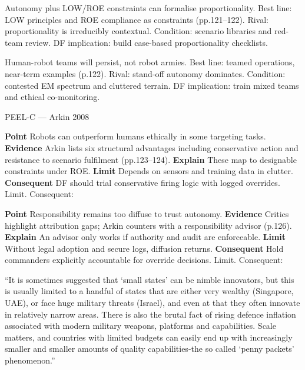 Autonomy plus LOW/ROE constraints can formalise proportionality. Best line: LOW principles and ROE compliance as constraints (pp.121–122). Rival: proportionality is irreducibly contextual. Condition: scenario libraries and red-team review. DF implication: build case-based proportionality checklists.

Human-robot teams will persist, not robot armies. Best line: teamed operations, near-term examples (p.122). Rival: stand-off autonomy dominates. Condition: contested EM spectrum and cluttered terrain. DF implication: train mixed teams and ethical co-monitoring.

PEEL-C — Arkin 2008

\textbf{Point} Robots can outperform humans ethically in some targeting tasks. \textbf{Evidence} Arkin lists six structural advantages including conservative action and resistance to scenario fulfilment (pp.123–124). \textbf{Explain} These map to designable constraints under ROE. \textbf{Limit} Depends on sensors and training data in clutter. \textbf{Consequent} DF should trial conservative firing logic with logged overrides. Limit. Consequent:

\textbf{Point} Responsibility remains too diffuse to trust autonomy. \textbf{Evidence} Critics highlight attribution gaps; Arkin counters with a responsibility advisor (p.126). \textbf{Explain} An advisor only works if authority and audit are enforceable. \textbf{Limit} Without legal adoption and secure logs, diffusion returns. \textbf{Consequent} Hold commanders explicitly accountable for override decisions. Limit. Consequent:

\parencite{FLYNN_2019} ``It is sometimes suggested that ‘small 
states’ can be nimble innovators, but this is usually limited to a handful of states that are 
either very wealthy (Singapore, UAE), or face huge military threats (Israel), and even at that 
they often innovate in relatively narrow areas. There is also the brutal fact of rising defence 
inflation associated with modern military weapons, platforms and capabilities. Scale matters, 
and countries with limited budgets can easily end up with increasingly smaller and smaller 
amounts of quality capabilities-the so called ‘penny packets’ phenomenon.''

